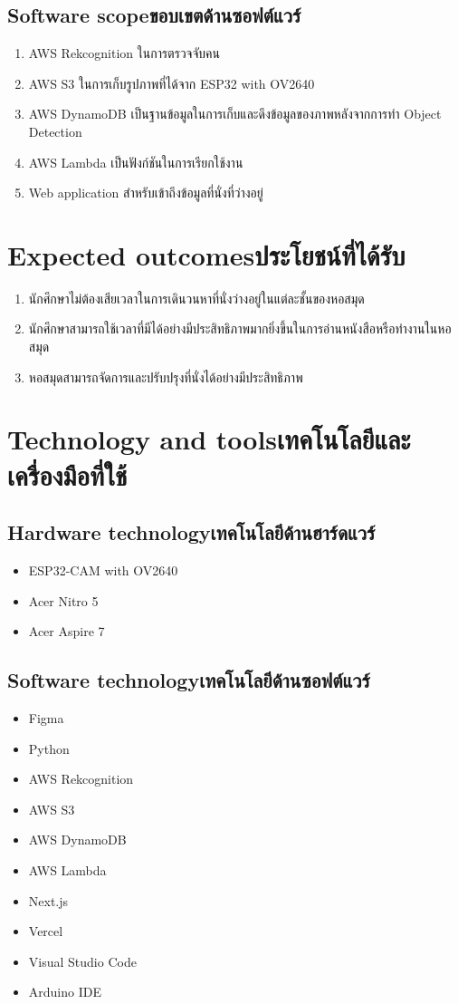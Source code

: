 \subsection{\ifenglish Software scope\else ขอบเขตด้านซอฟต์แวร์\fi}
\begin{enumerate}
    \item AWS Rekcognition ในการตรวจจับคน
    \item AWS S3 ในการเก็บรูปภาพที่ได้จาก ESP32 with OV2640
    \item AWS DynamoDB เป็นฐานข้อมูลในการเก็บและดึงข้อมูลของภาพหลังจากการทำ Object Detection
    \item AWS Lambda เป็นฟังก์ชันในการเรียกใช้งาน
    \item Web application สำหรับเข้าถึงข้อมูลที่นั่งที่ว่างอยู่
\end{enumerate}

\section{\ifenglish Expected outcomes\else ประโยชน์ที่ได้รับ\fi}
\begin{enumerate}
   \item นักศึกษาไม่ต้องเสียเวลาในการเดินวนหาที่นั่งว่างอยู่ในแต่ละชั้นของหอสมุด
   \item นักศึกษาสามารถใช้เวลาที่มีได้อย่างมีประสิทธิภาพมากยิ่งขึ้นในการอ่านหนังสือหรือทำงานในหอสมุด
   \item หอสมุดสามารถจัดการและปรับปรุงที่นั่งได้อย่างมีประสิทธิภาพ 
\end{enumerate}
\section{\ifenglish Technology and tools\else เทคโนโลยีและเครื่องมือที่ใช้\fi}

\subsection{\ifenglish Hardware technology\else เทคโนโลยีด้านฮาร์ดแวร์\fi}
\begin{itemize}
    \item ESP32-CAM with OV2640
    \item Acer Nitro 5
    \item Acer Aspire 7
\end{itemize}
\subsection{\ifenglish Software technology\else เทคโนโลยีด้านซอฟต์แวร์\fi}
\begin{itemize}
    \item Figma
    \item Python
    \item AWS Rekcognition
    \item AWS S3
    \item AWS DynamoDB
    \item AWS Lambda
    \item Next.js
    \item Vercel
    \item Visual Studio Code
    \item Arduino IDE    
\end{itemize}
